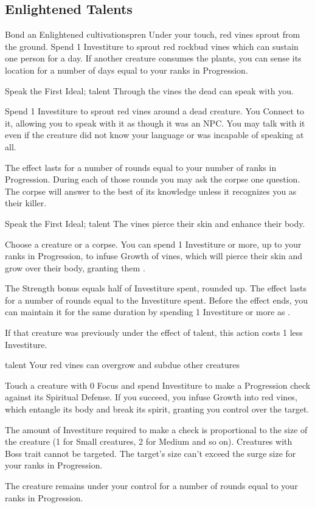 \subsection{Enlightened Talents}

		{Bond an Enlightened cultivationspren}
		{\iconAction}
		{Under your touch, red vines sprout from the ground.}
		{Spend 1 Investiture to sprout red rockbud vines which can sustain one person for a day. If another creature consumes the plants, you can sense its location for a number of days equal to your ranks in Progression.}
	
\newpage	
\talent{\talentEdgedancerSpeakWithDeadName{}}
		{Speak the First Ideal; \talentEdgedancerKeyName{} talent}
		{\iconAction}
		{Through the vines the dead can speak with you.}
		{Spend 1 Investiture to sprout red vines around a dead creature. You Connect to it, allowing you to speak with it as though it was an NPC. You may talk with it even if the creature did not know your language or was incapable of speaking at all.
			
		The effect lasts for a number of rounds equal to your number of ranks in Progression. During each of those rounds you may ask the corpse one question. The corpse will answer to the best of its knowledge unless it recognizes you as their killer.}
		
\talent{\talentEdgedancerEnhanceName}
		{Speak the First Ideal; \talentEdgedancerKeyName{} talent}
		{\iconActionDouble}
		{The vines pierce their skin and enhance their body.}
		{Choose a creature or a corpse. You can spend 1 Investiture or more, up to your ranks in Progression, to infuse Growth of vines, which will pierce their skin and grow over their body, granting them . 
			
		The Strength bonus equals half of Investiture spent, rounded up. The effect lasts for a number of rounds equal to the Investiture spent. Before the effect ends, you can maintain it	for the same duration by spending 1 Investiture or more as \iconFreeAction{}. 
		
		If that creature was previously under the effect of \talentEdgedancerKeyName{} talent, this action costs 1 less Investiture.}
		
\talent{\talentEdgedancerPuppeteerName}
		{\talentEdgedancerEnhanceName{} talent}
		{\iconActionDouble}
		{Your red vines can overgrow and subdue other creatures}
		{Touch a creature with 0 Focus and spend Investiture to make a Progression check against its Spiritual Defense. If you succeed, you infuse Growth into red vines, which entangle its body and break its spirit, granting you control over the target.
			
		The amount of Investiture required to make a check is proportional to the size of the creature (1 for Small creatures, 2 for Medium and so on). Creatures with Boss trait cannot be targeted. The target's size can’t exceed the surge size for your ranks in Progression. 
			
		The creature remains under your control for a number of rounds equal to your ranks in Progression.}
	
